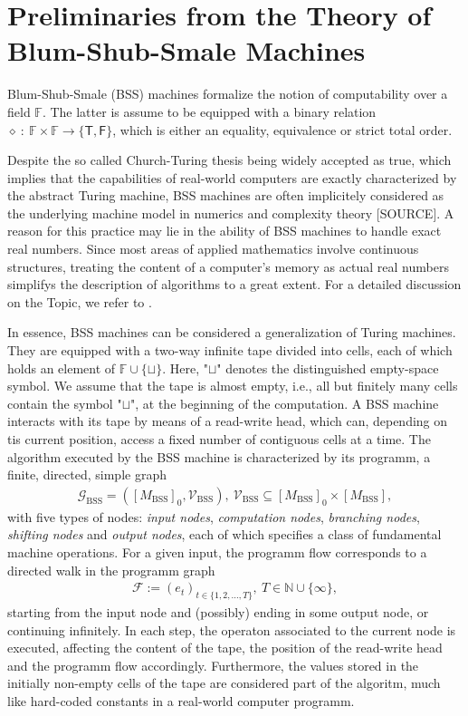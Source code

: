 \documentclass[conference]{IEEEtran}
\def\G{{\mathcal G}}
\def\V{{\mathcal V}}
\def\F{{\mathcal F}}
\def\NN{{\mathbb N}}
\def\FF{{\mathbb F}}
\newcommand{\BSS}{\mathrm{BSS}}
\newcommand{\sdummy}{{\color{red}[SOURCE]}}
\begin{document}
\section{Preliminaries from the Theory of Blum-Shub-Smale Machines}	\label{sec:PreliminariesBSS}	    	
	\noindent Blum-Shub-Smale (BSS) machines formalize the notion of computability over a field \(\FF\). The latter is assume to be equipped 
	with a binary relation \(\diamond~{:}~\FF \times \FF \rightarrow \{\mathsf{T},\mathsf{F}\}\), which is either an equality, equivalence or strict total order. 
	
	Despite the so called Church-Turing thesis being widely accepted as true, which implies that the capabilities of real-world computers are exactly characterized 
	by the abstract Turing machine, BSS machines are often implicitely considered as the underlying machine model in numerics and complexity theory \sdummy. 
	A reason for this practice may lie in the ability of BSS machines to handle exact real numbers. Since most areas of applied mathematics involve continuous structures, 
	treating the content of a computer's memory as actual real numbers simplifys the description of algorithms to a great extent. For a detailed discussion on the Topic, we refer to \cite{Bl04}.

	In essence, BSS machines can be considered a generalization of Turing machines. They are equipped with a two-way infinite tape divided into cells, each of which holds an 
	element of \(\FF\cup\{\sqcup\}\). Here, "\(\sqcup\)" denotes the distinguished empty-space symbol. We assume that the tape is almost empty, i.e., all but finitely many cells 
	contain the symbol "\(\sqcup\)", at the beginning of the computation. A BSS machine interacts with its tape by means of a read-write head, which can, depending on tis current 
	position, access a fixed number of contiguous cells at a time. The algorithm executed by the BSS machine is characterized by its programm, a finite, directed, simple graph 
	\begin{align*}   \G_\BSS = ([M_\BSS]_{0}, \V_\BSS),~ \V_\BSS \subseteq [M_\BSS]_{0} \times [M_\BSS],
	\end{align*} 
	with five types of nodes: \emph{input nodes}, \emph{computation nodes}, \emph{branching nodes}, \emph{shifting nodes} and \emph{output nodes}, each of which specifies a class 
	of fundamental machine operations. For a given input, the programm flow corresponds to a directed walk in the programm graph
	\begin{align*}	\F := (e_t)_{t\in\{1,2,\ldots,T\}},~T\in\NN\cup \{\infty\},
	\end{align*}
	starting from the input node and (possibly) ending in some output node, or continuing infinitely. In each step, the operaton associated to the current node is executed, 
	affecting the content of the tape, the position of the read-write head and the programm flow accordingly. Furthermore, the values stored in the initially non-empty cells 
	of the tape are considered part of the algoritm, much like hard-coded constants in a real-world computer programm. 
\end{document}
